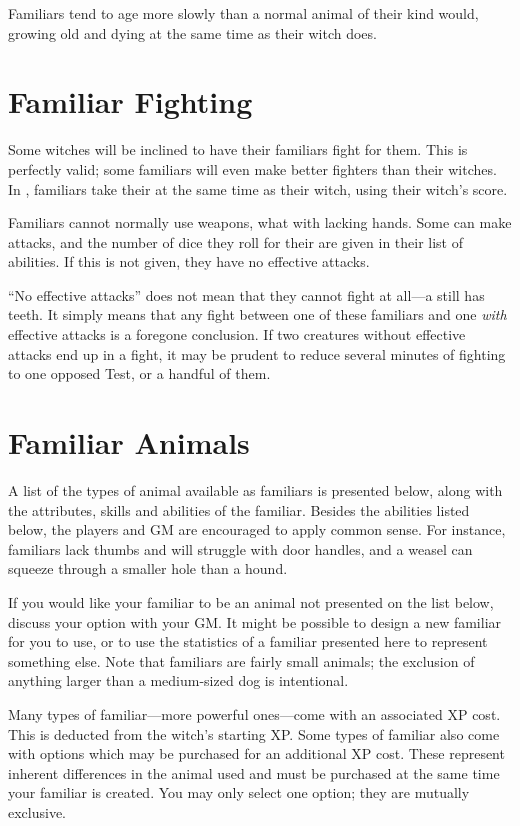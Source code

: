 Familiars tend to age more slowly than a normal animal of their kind would, growing old and dying at the same time as their witch does.

\section{Familiar Fighting}

Some witches will be inclined to have their familiars fight for them.
This is perfectly valid; some familiars will even make better fighters than their witches.
In {\structuredtime}, familiars take their {\turn} at the same time as their witch, using their witch's {\initiative} score.

Familiars cannot normally use weapons, what with lacking hands.
Some can make  attacks, and the number of dice they roll for their {\damagetests} are given in their list of abilities.
If this is not given, they have no effective attacks.

``No effective attacks'' does not mean that they cannot fight at all---a  still has teeth.
It simply means that any fight between one of these familiars and one \emph{with} effective attacks is a foregone conclusion.
If two creatures without effective attacks end up in a fight, it may be prudent to reduce several minutes of fighting to one opposed Test, or a handful of them.

\section{Familiar Animals}

A list of the types of animal available as familiars is presented below, along with the attributes, skills and abilities of the familiar.
Besides the abilities listed below, the players and GM are encouraged to apply common sense.
For instance, familiars lack thumbs and will struggle with door handles, and a weasel can squeeze through a smaller hole than a hound.

If you would like your familiar to be an animal not presented on the list below, discuss your option with your GM.
It might be possible to design a new familiar for you to use, or to use the statistics of a familiar presented here to represent something else.
Note that familiars are fairly small animals; the exclusion of anything larger than a medium-sized dog is intentional.

Many types of familiar---more powerful ones---come with an associated XP cost.
This is deducted from the witch's starting XP.
Some types of familiar also come with options which may be purchased for an additional XP cost.
These represent inherent differences in the animal used and must be purchased at the same time your familiar is created.
You may only select one option; they are mutually exclusive.

